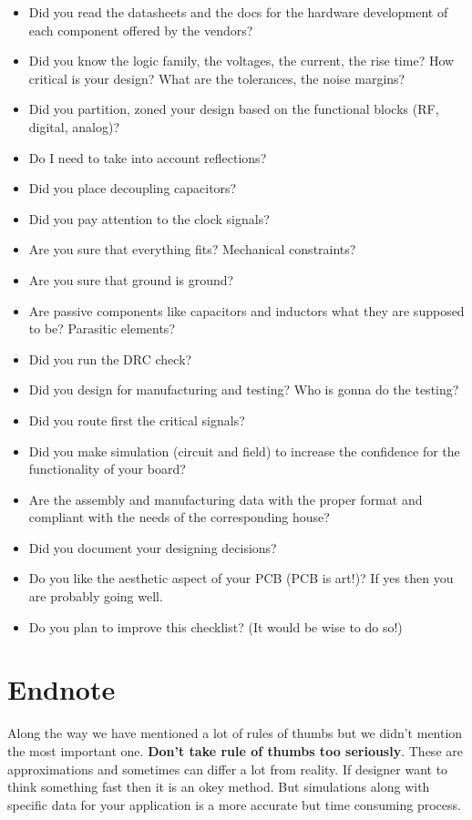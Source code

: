 \documentclass[final]{cubedoc}
\begin{document}
	\begin{itemize}
		\item Did you read the datasheets and the docs for the hardware development of each component offered by the vendors?
		\item Did you know the logic family, the voltages, the current, the rise time? How critical is your design?  What are the tolerances, the noise margins? 
		\item Did you partition, zoned your design based on the functional blocks (RF, digital, analog)?
		\item Do I need to take into account reflections? 
		\item Did you place decoupling capacitors?
		\item Did you pay attention to the clock signals?
		\item Are you sure that everything fits? Mechanical constraints?
		\item Are you sure that ground is ground?
		\item Are passive components like capacitors and inductors what they are supposed to be? Parasitic elements?
		\item Did you run the DRC check?
		\item Did you design for manufacturing and testing? Who is gonna do the testing?
		\item Did you route first the critical signals?
		\item Did you make simulation (circuit and field) to increase the confidence for the functionality of your board? 
		\item Are the assembly and manufacturing data with the proper format and compliant with the needs of the corresponding house?	
		\item Did you document your designing decisions?
		\item Do you like the aesthetic aspect of your PCB (PCB is art!)? If yes then you are probably going well.
		\item Do you plan to improve this checklist? (It would be wise to do so!)
	\end{itemize}
	
	\section{Endnote}
	
	Along the way we have mentioned a lot of rules of thumbs but we didn't mention the most important one. \textbf{Don't take rule of thumbs too seriously}. These are approximations and sometimes can differ a lot from reality. If designer want to think something fast then it is an okey method. But simulations along with specific data for your application is a more accurate but time consuming process. 
	
\end{document}
